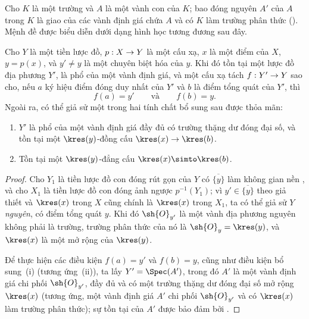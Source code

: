 \documentclass[oneside,10pt]{amsart}
\makeatletter
\newcommand{\ega@arrow}[2]{\mathchoice{#1}{#2}{#2}{#2}}
\renewcommand{\to}{\ega@arrow{\longrightarrow}{\rightarrow}}
\let\EGAOriginalLabel\label
\renewcommand{\label}[1]{\phantomsection\EGAOriginalLabel{#1}}
\makeatother
\begin{document}
\begin{env}[7.1.3]
\label{II.7.1.3}
Cho $K$ là một trường và $A$ là một vành con của $K$;
bao đóng nguyên $A'$ của $A$ trong $K$ là giao của các vành định giá chứa $A$ và có $K$ làm trường phân thức (\cite[p.~51, Định lý~2]{I-11}).
Mệnh đề  được biểu diễn dưới dạng hình học tương đương sau đây.
\end{env}

\begin{proposition}[7.1.4]
\label{II.7.1.4}
Cho $Y$ là một tiền lược đồ, $p:X\to Y$ là một cấu xạ, $x$ là một điểm của $X$, $y=p(x)$, và $y'\neq y$ là một chuyên biệt hóa  của $y$.
Khi đó tồn tại một lược đồ địa phương $Y'$, là phổ của một vành định giá, và một cấu xạ tách $f:Y'\to Y$ sao cho, nếu $a$ ký hiệu điểm đóng duy nhất của $Y'$ và $b$ là điểm tổng quát của $Y'$, thì
\[
  f(a)=y'
  \qquad\text{và}\qquad
  f(b)=y.
\]
Ngoài ra, có thể giả sử một trong hai tính chất bổ sung sau được thỏa mãn:
\begin{enumerate}
  \item[\rm{(i)}] $Y'$ là phổ của một vành định giá đầy đủ có trường thặng dư đóng đại số, và tồn tại một $\kres(y)$-đồng cấu $\kres(x)\to\kres(b)$.
  \item[\rm{(ii)}] Tồn tại một $\kres(y)$-đẳng cấu $\kres(x)\simto\kres(b)$.
\end{enumerate}
\end{proposition}

\begin{proof}
Cho $Y_1$ là tiền lược đồ con đóng rút gọn của $Y$ có $\overline{\{y\}}$ làm không gian nền , và cho $X_1$ là tiền lược đồ con đóng ảnh ngược $p^{-1}(Y_1)$;
vì $y'\in\overline{\{y\}}$ theo giả thiết và $\kres(x)$ trong $X$ cũng chính là $\kres(x)$ trong $X_1$, ta có thể giả sử $Y$ \emph{nguyên}, có điểm tổng quát $y$.
Khi đó $\sh{O}_{y'}$ là một vành địa phương nguyên không phải là trường, trường phân thức của nó là $\sh{O}_y=\kres(y)$, và $\kres(x)$ là một mở rộng của $\kres(y)$.

Để thực hiện các điều kiện $f(a)=y'$ và $f(b)=y$, cũng như điều kiện bổ sung~(i) (tương ứng~(ii)), ta lấy $Y'=\Spec(A')$, trong đó $A'$ là một vành định giá chi phối $\sh{O}_{y'}$, đầy đủ và có một trường thặng dư đóng đại số mở rộng $\kres(x)$ (tương ứng, một vành định giá $A'$ chi phối $\sh{O}_{y'}$ và có $\kres(x)$ làm trường phân thức);
sự tồn tại của $A'$ được bảo đảm bởi .
\end{proof}
\end{document}
